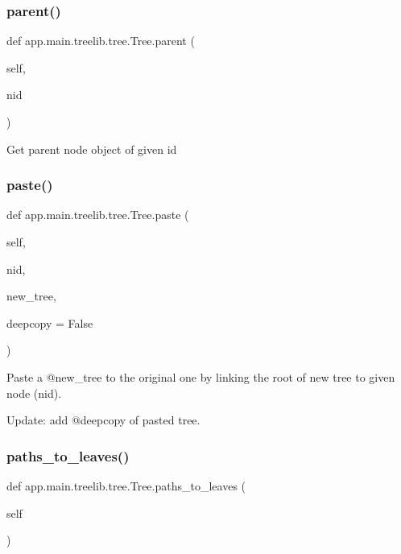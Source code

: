 \subsubsection{\texorpdfstring{parent()}{parent()}}
{\footnotesize\ttfamily def app.\+main.\+treelib.\+tree.\+Tree.\+parent (\begin{DoxyParamCaption}\item[{}]{self,  }\item[{}]{nid }\end{DoxyParamCaption})}

\begin{DoxyVerb}Get parent node object of given id\end{DoxyVerb}
 \mbox{\label{classapp_1_1main_1_1treelib_1_1tree_1_1Tree_a813bf6c69928f2004c0f1e04ce14e9b8}} 
\subsubsection{\texorpdfstring{paste()}{paste()}}
{\footnotesize\ttfamily def app.\+main.\+treelib.\+tree.\+Tree.\+paste (\begin{DoxyParamCaption}\item[{}]{self,  }\item[{}]{nid,  }\item[{}]{new\+\_\+tree,  }\item[{}]{deepcopy = {\ttfamily False} }\end{DoxyParamCaption})}

\begin{DoxyVerb}Paste a @new_tree to the original one by linking the root
of new tree to given node (nid).

Update: add @deepcopy of pasted tree.
\end{DoxyVerb}
 \mbox{\label{classapp_1_1main_1_1treelib_1_1tree_1_1Tree_a0ce0cd39e8c6323cc9112b6f2325ffec}} 
\subsubsection{\texorpdfstring{paths\+\_\+to\+\_\+leaves()}{paths\_to\_leaves()}}
{\footnotesize\ttfamily def app.\+main.\+treelib.\+tree.\+Tree.\+paths\+\_\+to\+\_\+leaves (\begin{DoxyParamCaption}\item[{}]{self }\end{DoxyParamCaption})}

